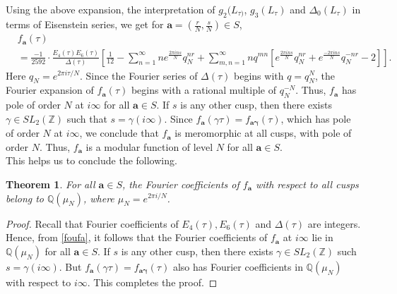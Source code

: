 \documentclass[11pt, reqno]{amsart}
\newtheorem{theorem}{Theorem}[section]
\begin{document}
Using the above expansion, the interpretation of $g_2(L_{\tau)}$, $g_3(L_{\tau})$ and $\Delta_{0}(L_{\tau})$ in terms of Eisenstein series, we get for $\boldsymbol{a}= \left( \frac{r}{N}, \frac{s}{N} \right) \in S$,
\begin{align}
& f_{\boldsymbol{a}}(\tau) \nonumber \\
& =\frac{-1}{2592}\cdot\frac{E_4(\tau)E_6(\tau)}{\Delta(\tau)}\left[\frac{1}{12} -\sum_{n=1}^\infty ne^{\frac{2\pi i n s}{N}} q_N^{n r}+\sum_{m,n=1}^\infty n q^{m n}\left[e^{\frac{2\pi i n s}{N}}q_N^{n r}+e^{\frac{-2\pi i n s}{N}}q_N^{-n r}-2 \right]\right]. \label{foufa}
\end{align}
Here $q_N = e^{2 \pi i \tau/N}$. Since the Fourier series of $\Delta(\tau)$ begins with $q=q_N^N$, the Fourier expansion of $f_{\boldsymbol{a}}(\tau)$  begins with a rational multiple of $q_N^{-N}$. Thus, $f_{\boldsymbol{a}}$ has pole of order $N$ at $i\infty$ for all $\boldsymbol{a}\in S$. If $s$ is any other cusp, then there exists $\gamma\in S L_2(\mathbb{Z})$ such that $s=\gamma(i\infty)$. Since $f_{\boldsymbol{a}}(\gamma\tau)=f_{\boldsymbol{a\gamma}}(\tau)$, which has pole of order $N$ at $i\infty$, we conclude that $f_{\boldsymbol{a}}$ is meromorphic at all cusps, with pole of order $N$. Thus, $f_{\boldsymbol{a}}$ is a modular function of level $N$ for all $ \boldsymbol{a} \in S$. \\

This helps us to conclude the following.
\begin{theorem}\label{primiext}
For all $\boldsymbol{a} \in S$, the Fourier coefficients of $f_{\boldsymbol{a}}$ with respect to all cusps belong to $\mathbb{Q}(\mu_N)$, where $\mu_N=e^{2\pi i/N}$. 
\end{theorem}
\begin{proof}
   Recall that Fourier coefficients of $E_4(\tau), E_6(\tau)$ and $\Delta(\tau)$ are integers. Hence, from \eqref{foufa}, it follows that the Fourier coefficients of $f_{\boldsymbol{a}}$ at $i\infty$ lie in $\mathbb{Q}(\mu_N)$ for all $\boldsymbol{a}\in S$. If $s$ is any other cusp, then there exists $\gamma\in S L_2(\mathbb{Z})$ such $s=\gamma(i\infty)$. But $f_{\boldsymbol{a}}(\gamma\tau)=f_{\boldsymbol{a\gamma}}(\tau)$ also has Fourier coefficients in $\mathbb{Q}(\mu_N)$ with respect to $i\infty$. This completes the proof.
\end{proof}
\end{document}
